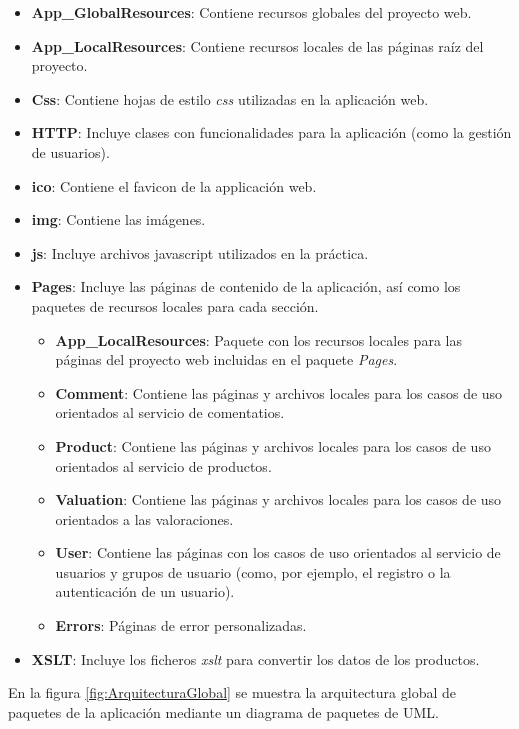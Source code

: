\documentclass{article}
\begin{document}
\begin{itemize}
	\begin{itemize}
		\item \textbf{App\_GlobalResources}: Contiene recursos globales del proyecto web.
		\item \textbf{App\_LocalResources}: Contiene recursos locales de las páginas raíz del proyecto.
		\item \textbf{Css}: Contiene hojas de estilo \emph{css} utilizadas en la aplicación web.
		\item \textbf{HTTP}: Incluye clases con funcionalidades para la aplicación (como la gestión de usuarios).
		\item \textbf{ico}: Contiene el favicon de la applicación web.
		\item \textbf{img}: Contiene las imágenes.
		\item \textbf{js}: Incluye archivos javascript utilizados en la práctica.
		\item \textbf{Pages}: Incluye las páginas de contenido de la aplicación, así como los paquetes de recursos locales para cada sección.
		\begin{itemize}
			\item \textbf{App\_LocalResources}: Paquete con los recursos locales para las páginas del proyecto web incluidas en el paquete \emph{Pages}.
			\item \textbf{Comment}: Contiene las páginas y archivos locales para los casos de uso orientados al servicio de comentatios.
			\item \textbf{Product}: Contiene las páginas y archivos locales para los casos de uso orientados al servicio de productos.
			\item \textbf{Valuation}: Contiene las páginas y archivos locales para los casos de uso orientados a las valoraciones.
			\item \textbf{User}: Contiene las páginas con los casos de uso orientados al servicio de usuarios y grupos de usuario (como, por ejemplo, el registro o la autenticación de un usuario).
			\item \textbf{Errors}: Páginas de error personalizadas.
		\end{itemize}
		\item \textbf{XSLT}: Incluye los ficheros \emph{xslt} para convertir los datos de los productos.
	\end{itemize}			
\end{itemize}

	En la figura \ref{fig:ArquitecturaGlobal} se muestra la arquitectura global de paquetes de la aplicación mediante un diagrama de paquetes de UML.
\end{document}
